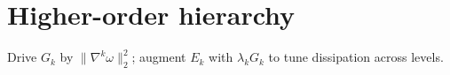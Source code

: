 \section{Higher-order hierarchy}
Drive $G_k$ by $\|\nabla^k\omega\|_2^2$; augment $E_k$ with $\lambda_k G_k$ to tune dissipation across levels.
